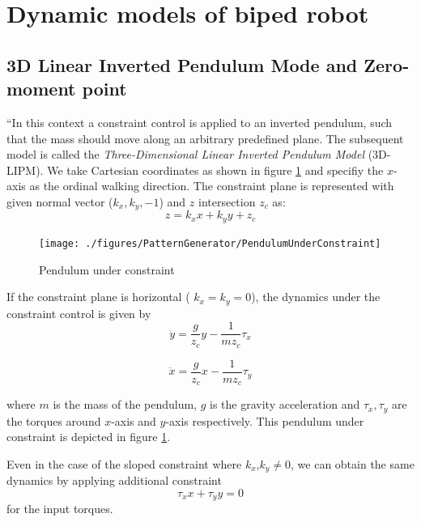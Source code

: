 \section{Dynamic models of biped robot}

\subsection{3D Linear Inverted Pendulum Mode and Zero-moment point}

``In this context a constraint control is applied to an inverted pendulum,
such that the mass should move along an arbitrary predefined plane.
The subsequent model is called the \textit{Three-Dimensional Linear Inverted Pendulum Model} (3D-LIPM).
We take Cartesian coordinates as shown
in figure \ref{pic:PendulumUnderConstraint} and specifiy the $x$-axis as the ordinal walking
direction. The constraint plane is represented with given normal
vector ($k_x,k_y,-1$) and $z$ intersection $z_c$ as:
\begin{equation}
z = k_x x + k_y y + z_c
\label{eq:ConstraintPlane}
\end{equation}
\begin{figure}[htb]
\begin{center}
\texttt{[image: ./figures/PatternGenerator/PendulumUnderConstraint]}
\caption{Pendulum under constraint}
\label{pic:PendulumUnderConstraint}
\end{center}
\end{figure}

If the constraint plane is horizontal ( $k_x = k_y = 0$),
the dynamics under the constraint control is given by
\begin{equation}
\ddot{y} = \frac{g}{z_c} y - \frac{1}{m z_c} \tau_x
\label{eq:DynConstraintLawY}
\end{equation}

\begin{equation}
\ddot{x} = \frac{g}{z_c} x - \frac{1}{m z_c} \tau_y
\label{eq:DynConstraintLawX}
\end{equation}

where $m$ is the mass of the pendulum, $g$ is the gravity acceleration
and $\tau_x, \tau_y$ are the torques around $x$-axis and $y$-axis
respectively. This pendulum under constraint is depicted in figure \ref{pic:PendulumUnderConstraint}.
\par
Even in the case of the sloped constraint where $k_x$,$k_y \neq 0 $,
we can obtain the same dynamics by applying additional constraint
\begin{equation}
\tau_x x + \tau_y y  = 0
\label{eq:ConstraintTorque}
\end{equation}
for the input torques.

